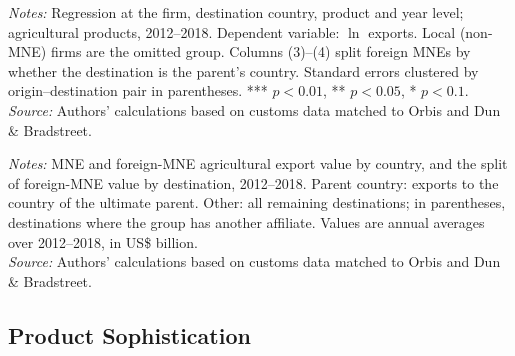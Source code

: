 \documentclass[11pt,a4paper]{article}
\newcommand{\srcnote}{\textit{Source:} Authors' calculations based on customs data matched to Orbis and Dun \& Bradstreet.}
\begin{document}
\begin{table}[H]\centering\small%
  \caption{Distance and Firm Agricultural Exports: Foreign and Domestic Multinationals}%
  \label{tab:ap_dist}%
  \par\vspace{3pt}%
  \begin{minipage}{0.95\textwidth}\footnotesize %
  \textit{Notes:} Regression at the firm, destination country, product and year level; agricultural products, 2012--2018. Dependent variable: $\ln$ exports. Local (non-MNE) firms are the omitted group. Columns (3)--(4) split foreign MNEs by whether the destination is the parent's country. Standard errors clustered by origin--destination pair in parentheses. *** $p<0.01$, ** $p<0.05$, * $p<0.1$.\\[3pt]%
  \srcnote%
  \end{minipage}%
  \end{table}
\begin{table}[H]\centering\small%
  \caption{Multinational Agricultural Exports by Exporting Country and Destination Type}%
  \label{tab:ap_pres}%
  \par\vspace{3pt}%
  \begin{minipage}{0.95\textwidth}\footnotesize %
  \textit{Notes:} MNE and foreign-MNE agricultural export value by country, and the split of foreign-MNE value by destination, 2012--2018. Parent country: exports to the country of the ultimate parent. Other: all remaining destinations; in parentheses, destinations where the group has another affiliate. Values are annual averages over 2012--2018, in US\$ billion.\\[3pt]%
  \srcnote%
  \end{minipage}%
  \end{table}

\subsection{Product Sophistication}\label{sec:ap_soph}
\end{document}
